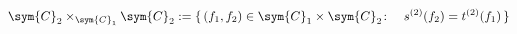 \begin{equation}
  \sym{C}_2\times_{\sym{C}_1}\sym{C}_2:=\{\,(f_1,f_2)\in\sym{C}_1\times\sym{C}_2
    \colon\quad s^{(2)}(f_2)=t^{(2)}(f_1)\,\}
\end{equation}

